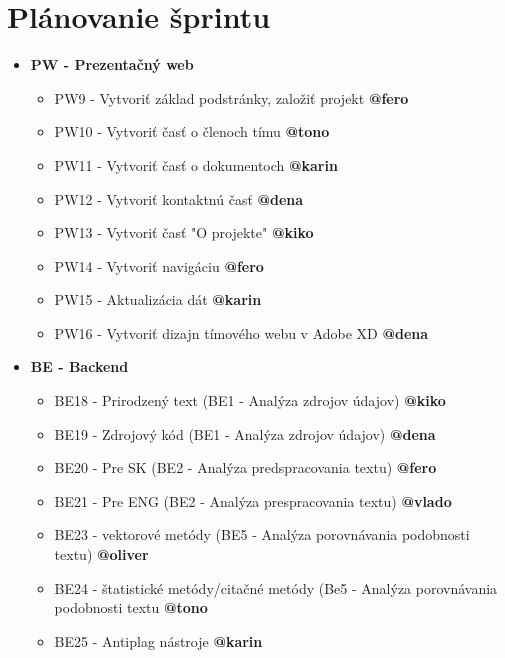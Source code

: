 \documentclass{article}
\begin{document}
    \section*{Plánovanie šprintu}

    \begin{itemize}
    \item \textbf {PW - Prezentačný web} 
        \begin{itemize}
            \item PW9 - Vytvoriť základ podstránky, založiť projekt \textbf {@fero}
            \item PW10 - Vytvoriť časť o členoch tímu \textbf {@tono}
            \item PW11 - Vytvoriť časť o dokumentoch \textbf {@karin}
            \item PW12 - Vytvoriť kontaktnú časť \textbf {@dena}
            \item PW13 - Vytvoriť časť "O projekte" \textbf {@kiko}
            \item PW14 - Vytvoriť navigáciu \textbf {@fero}
            \item PW15 - Aktualizácia dát \textbf {@karin}
            \item PW16 - Vytvoriť dizajn tímového webu v Adobe XD \textbf {@dena}   
        \end{itemize}
    \item \textbf {BE - Backend} 
        \begin{itemize}
            \item BE18 - Prirodzený text (BE1 - Analýza zdrojov údajov) \textbf {@kiko}
            \item BE19 - Zdrojový kód (BE1 - Analýza zdrojov údajov) \textbf {@dena}
            \item BE20 - Pre SK (BE2 - Analýza predspracovania textu) \textbf {@fero}
            \item BE21 - Pre ENG (BE2 - Analýza prespracovania textu) \textbf {@vlado}
            \item BE23 - vektorové metódy (BE5 - Analýza porovnávania podobnosti textu) \textbf {@oliver}
            \item BE24 - štatistické metódy/citačné metódy (Be5 - Analýza porovnávania podobnosti textu \textbf {@tono}
            \item BE25 - Antiplag nástroje \textbf {@karin}
        \end{itemize}        
    \end{itemize}
\end{document}
